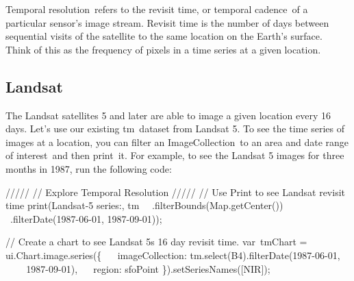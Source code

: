 \documentclass[
  letterpaper,
  DIV=11,
  numbers=noendperiod]{scrreprt}
\newenvironment{Shaded}{\begin{snugshade}}{\end{snugshade}}
\newcommand{\AttributeTok}[1]{\textcolor[rgb]{0.40,0.45,0.13}{#1}}
\newcommand{\BuiltInTok}[1]{\textcolor[rgb]{0.00,0.23,0.31}{#1}}
\newcommand{\CommentTok}[1]{\textcolor[rgb]{0.37,0.37,0.37}{#1}}
\newcommand{\DataTypeTok}[1]{\textcolor[rgb]{0.68,0.00,0.00}{#1}}
\newcommand{\FunctionTok}[1]{\textcolor[rgb]{0.28,0.35,0.67}{#1}}
\newcommand{\NormalTok}[1]{\textcolor[rgb]{0.00,0.23,0.31}{#1}}
\newcommand{\OperatorTok}[1]{\textcolor[rgb]{0.37,0.37,0.37}{#1}}
\newcommand{\StringTok}[1]{\textcolor[rgb]{0.13,0.47,0.30}{#1}}
\begin{document}
Temporal resolution~refers to the revisit time, or temporal cadence~of a
particular sensor's image stream. Revisit time is the number of days
between sequential visits of the satellite to the same location on the
Earth's surface. Think of this as the frequency of pixels in a time
series at a given location.

\hypertarget{landsat}{%
\subsection{Landsat}\label{landsat}}

The Landsat satellites 5 and later are able to image a given location
every 16 days. Let's use our existing tm~dataset from Landsat 5. To see
the time series of images at a location, you can filter an
ImageCollection~to an area and date range of interest~and then print~it.
For example, to see the Landsat 5 images for three months in 1987, run
the following code:

\begin{Shaded}
\begin{Highlighting}[]
\CommentTok{/////  }
\CommentTok{// Explore Temporal Resolution  }
\CommentTok{/////  }
\CommentTok{// Use Print to see Landsat revisit time  }
\FunctionTok{print}\NormalTok{(}\StringTok{\textquotesingle{}Landsat{-}5 series:\textquotesingle{}}\OperatorTok{,}\NormalTok{ tm  }\AttributeTok{ }\OperatorTok{.}\FunctionTok{filterBounds}\NormalTok{(}\BuiltInTok{Map}\OperatorTok{.}\FunctionTok{getCenter}\NormalTok{())  }
  \AttributeTok{ }\OperatorTok{.}\FunctionTok{filterDate}\NormalTok{(}\StringTok{\textquotesingle{}1987{-}06{-}01\textquotesingle{}}\OperatorTok{,} \StringTok{\textquotesingle{}1987{-}09{-}01\textquotesingle{}}\NormalTok{))}\OperatorTok{;}  
  
\CommentTok{// Create a chart to see Landsat 5\textquotesingle{}s 16 day revisit time.  }
\NormalTok{var tmChart }\OperatorTok{=}\NormalTok{ ui}\OperatorTok{.}\AttributeTok{Chart}\OperatorTok{.}\AttributeTok{image}\OperatorTok{.}\FunctionTok{series}\NormalTok{(\{  }
  \DataTypeTok{ imageCollection}\OperatorTok{:}\NormalTok{ tm}\OperatorTok{.}\FunctionTok{select}\NormalTok{(}\StringTok{\textquotesingle{}B4\textquotesingle{}}\NormalTok{)}\OperatorTok{.}\FunctionTok{filterDate}\NormalTok{(}\StringTok{\textquotesingle{}1987{-}06{-}01\textquotesingle{}}\OperatorTok{,}       \StringTok{\textquotesingle{}1987{-}09{-}01\textquotesingle{}}\NormalTok{)}\OperatorTok{,}  
  \DataTypeTok{ region}\OperatorTok{:}\NormalTok{ sfoPoint  }
\NormalTok{\})}\OperatorTok{.}\FunctionTok{setSeriesNames}\NormalTok{([}\StringTok{\textquotesingle{}NIR\textquotesingle{}}\NormalTok{])}\OperatorTok{;}
\end{Highlighting}
\end{Shaded}
\end{document}
